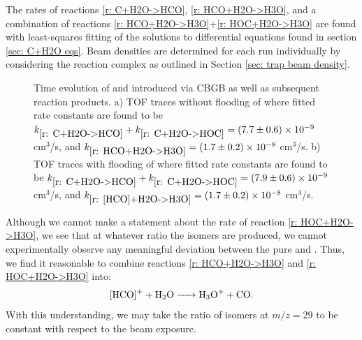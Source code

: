 The rates of reactions \ref{r: C+H2O->HCO}, \ref{r: HCO+H2O->H3O}, and a combination of reactions \ref{r: HCO+H2O->H3O}+\ref{r: HOC+H2O->H3O} are found with least-squares fitting of the solutions to differential equations found in section \ref{sec: C+H2O eqs}. Beam densities are determined for each run individually by considering the  reaction complex as outlined in Section \ref{sec: trap beam density}.

\begin{figure}[H]
	\centering
	\caption{Time evolution of  and  introduced via CBGB as well as subsequent reaction products. a) TOF traces without flooding of  where fitted rate constants are found to be $k_{\ref{r: C+H2O->HCO}}+k_{\ref{r: C+H2O->HOC}} = (7.7 \pm 0.6) \times 10^{-9}$ cm$^3$/s, and $k_{\ref{r: HCO+H2O->H3O}} = (1.7 \pm 0.2) \times 10^{-8}$ cm$^3$/s. b) TOF traces with flooding of  where fitted rate constants are found to be $k_{\ref{r: C+H2O->HCO}}+k_{\ref{r: C+H2O->HOC}} = (7.9 \pm 0.6) \times 10^{-9}$ cm$^3$/s, and $k_{\ref{r: [HCO]+H2O->H3O}} = (1.7 \pm 0.2) \times 10^{-8}$ cm$^3$/s.}
	\label{fig: [HCO]+H2O rate}
\end{figure}

Although we cannot make a statement about the rate of reaction \ref{r: HOC+H2O->H3O}, we see that at whatever ratio the isomers are produced, we cannot experimentally observe any meaningful deviation between the pure  and . Thus, we find it reasonable to combine reactions \ref{r: HCO+H2O->H3O} and \ref{r: HOC+H2O->H3O} into:
\begin{equation}
	\ce{[HCO]+ + H2O -> H3O+ + CO}. \label{r: [HCO]+H2O->H3O}
\end{equation}
With this understanding, we may take the ratio of isomers at $m/z=29$ to be constant with respect to the  beam exposure.

